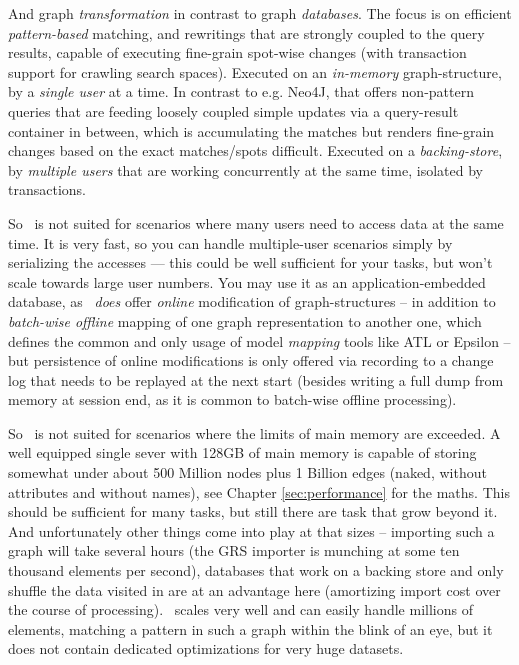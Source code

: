 And graph \emph{transformation} in contrast to graph \emph{databases}.
The focus is on efficient \emph{pattern-based} matching, and rewritings that are strongly coupled to the query results, capable of executing fine-grain spot-wise changes (with transaction support for crawling search spaces). 
Executed on an \emph{in-memory} graph-structure, by a \emph{single user} at a time.
In contrast to e.g. Neo4J\cite{neo}, that offers non-pattern queries that are feeding loosely coupled simple updates via a query-result container in between, which is accumulating the matches but renders fine-grain changes based on the exact matches/spots difficult.
Executed on a \emph{backing-store}, by \emph{multiple users} that are working concurrently at the same time, isolated by transactions.

So \GrG\ is not suited for scenarios where many users need to access data at the same time. 
It is very fast, so you can handle multiple-user scenarios simply by serializing the accesses --- this could be well sufficient for your tasks, but won't scale towards large user numbers.
You may use it as an application-embedded database, as
\GrG\ \emph{does} offer \emph{online} modification of graph-structures
-- in addition to \emph{batch-wise offline} mapping of one graph representation to another one, which defines the common and only usage of model \emph{mapping} tools like ATL\cite{atl} or Epsilon\cite{epsilon} --
but persistence of online modifications is only offered via recording to a change log that needs to be replayed at the next start
(besides writing a full dump from memory at session end, as it is common to batch-wise offline processing).

So \GrG\ is not suited for scenarios where the limits of main memory are exceeded.
A well equipped single sever with 128GB of main memory is capable of storing somewhat under about 500 Million nodes plus 1 Billion edges (naked, without attributes and without names), see Chapter \ref{sec:performance} for the maths.
This should be sufficient for many tasks, but still there are task that grow beyond it.
And unfortunately other things come into play at that sizes -- importing such a graph will take several hours (the GRS importer is munching at some ten thousand elements per second), databases that work on a backing store and only shuffle the data visited in are at an advantage here (amortizing import cost over the course of processing).
\GrG\ scales very well and can easily handle millions of elements, matching a pattern in such a graph within the blink of an eye, but it does not contain dedicated optimizations for very huge datasets.

